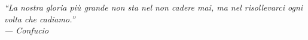 \thispagestyle{empty}

\vspace*{0.28\textheight}

\begin{flushright}
\begin{minipage}{0.62\textwidth}
\itshape
``La nostra gloria più grande non sta nel non cadere mai,
ma nel risollevarci ogni volta che cadiamo.''\\[1em]
\normalfont\raggedleft
--- Confucio
\end{minipage}
\end{flushright}

\vfill